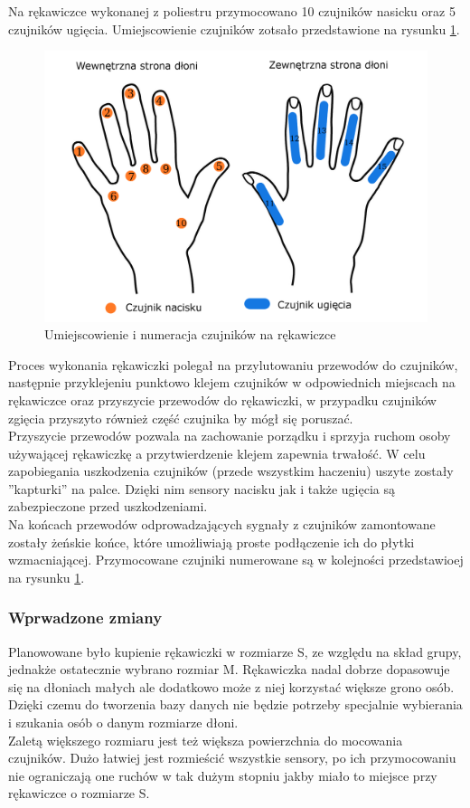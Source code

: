 ﻿\documentclass{article}
\begin{document}
Na rękawiczce wykonanej z poliestru przymocowano 10 czujników nasicku oraz 5 czujników ugięcia. Umiejscowienie czujników zotsało przedstawione na rysunku \ref{rys:czujniki_numeracja}.\\
\begin{figure}[H]
    \centering
    \includegraphics[width=14cm]{czujniki_numeracja.png}
    \caption{Umiejscowienie i numeracja czujników na rękawiczce}
    \label{rys:czujniki_numeracja}
\end{figure}
Proces wykonania rękawiczki polegał na przylutowaniu przewodów do czujników, następnie przyklejeniu punktowo klejem czujników w odpowiednich miejscach na rękawiczce oraz przyszycie przewodów do rękawiczki, w przypadku czujników zgięcia przyszyto również część czujnika by mógł się poruszać. \\
Przyszycie przewodów pozwala na zachowanie porządku i sprzyja ruchom osoby używającej rękawiczkę a przytwierdzenie klejem zapewnia trwałość. W celu zapobiegania uszkodzenia czujników (przede wszystkim haczeniu) uszyte zostały ''kapturki'' na palce. Dzięki nim sensory nacisku jak i także ugięcia są zabezpieczone przed uszkodzeniami.\\
Na końcach przewodów odprowadzających sygnały z czujników zamontowane zostały żeńskie końce, które umożliwiają proste podłączenie ich do płytki wzmacniającej. Przymocowane czujniki numerowane są w kolejności przedstawioej na rysunku \ref{rys:czujniki_numeracja}.

\subsubsection{Wprwadzone zmiany}
Planowowane było kupienie rękawiczki w rozmiarze S, ze względu na skład grupy, jednakże ostatecznie wybrano rozmiar M. Rękawiczka nadal dobrze dopasowuje się na dłoniach małych ale dodatkowo może z niej korzystać większe grono osób. Dzięki czemu do tworzenia bazy danych nie będzie potrzeby specjalnie wybierania i szukania osób o danym rozmiarze dłoni.\\
Zaletą większego rozmiaru jest też większa powierzchnia do mocowania czujników. Dużo łatwiej jest rozmieścić wszystkie sensory, po ich przymocowaniu nie ograniczają one ruchów w tak dużym stopniu jakby miało to miejsce przy rękawiczce o rozmiarze S.
\end{document}
